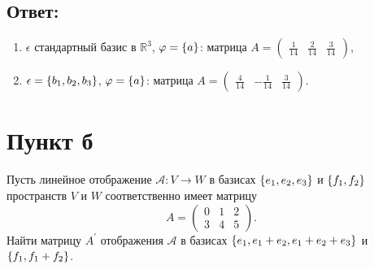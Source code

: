 \documentclass[12pt]{article}
\begin{document}
    \subsection*{Ответ:}
    \begin{enumerate}
        \item $\epsilon$ стандартный базис в $\mathbb{R}^3$, $\varphi = \left \{ a \right \}$: матрица
        $A =
        \begin{pmatrix}
            \frac{1}{14} & \frac{2}{14} & \frac{3}{14}
        \end{pmatrix}$,

        \item $\epsilon = \left \{ b_1, b_2, b_3 \right \}$, $\varphi = \left \{ a \right \}$: матрица
        $A =
        \begin{pmatrix}
            \frac{4}{14} & - \frac{1}{14} & \frac{3}{14}
        \end{pmatrix}$.
    \end{enumerate}

    \section*{Пункт б}
    Пусть линейное отображение $\mathcal{A}: V \rightarrow W$ в базисах $\left \{ e_1, e_2, e_3 \right \}$ и $\left \{ f_1, f_2 \right \}$ пространств $V$ и $W$ соответственно имеет матрицу
    \[
        A = \begin{pmatrix}
                0 & 1 & 2 \\
                3 & 4 & 5
        \end{pmatrix} .
    \]
    Найти матрицу $A^\prime$ отображения $\mathcal{A}$ в базисах $\left \{ e_1, e_1 + e_2, e_1 + e_2 + e_3 \right \}$ и $\left \{ f_1, f_1 + f_2 \right \}$.
\end{document}

